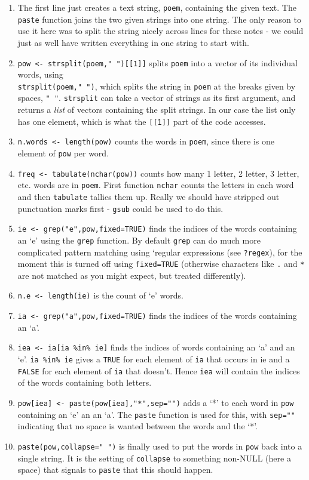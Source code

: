 \documentclass[10pt] {article}
\theoremstyle{definition}
\begin{document}
\begin{enumerate}
\item The first line just creates a text string, {\tt poem}, containing the given text. The {\tt paste} function joins the two given strings into one string. The only reason to use it here was to split the string nicely across lines for these notes - we could just as well have written everything in one string to start with.
\item \verb+pow <- strsplit(poem," ")[[1]]+ splits {\tt poem} into a vector of its individual words, using\\ \verb+strsplit(poem," ")+, which splits the string in {\tt poem} at the breaks given by spaces, \verb+" "+. {\tt strsplit} can take a vector of strings as its first argument, and returns a {\em list} of vectors containing the split strings. In our case the list only has one element, which is what the \verb+[[1]]+ part of the code accesses. 
\item \verb+n.words <- length(pow)+ counts the words in {\tt poem}, since there is one element of {\tt pow} per word.
\item \verb+freq <- tabulate(nchar(pow))+ counts how many 1 letter, 2 letter, 3 letter, etc. words are in {\tt poem}. First function {\tt nchar} counts the letters in each word and then {\tt tabulate} tallies them up. Really we should have stripped out punctuation marks first - {\tt gsub} could be used to do this.
\item \verb+ie <- grep("e",pow,fixed=TRUE)+ finds the indices of the words containing an `e' using the {\tt grep} function. By default {\tt grep} can do much more complicated pattern matching using `regular expressions (see {\tt ?regex}), for the moment this is turned off using \verb+fixed=TRUE+ (otherwise characters like \verb+.+ and \verb+*+ are not matched as you might expect, but treated differently).
\item \verb+n.e <- length(ie)+ is the count of `e' words.
\item \verb+ia <- grep("a",pow,fixed=TRUE)+ finds the indices of the words containing an `a'.
\item \verb+iea <- ia[ia %in% ie]+ finds the indices of words containing an `a' and an `e'. \verb+ia %in% ie+ gives a {\tt TRUE} for each element of {\tt ia} that occurs in {ie} and a {\tt FALSE} for each element of {\tt ia} that doesn't. Hence {\tt iea} will contain the indices of the words containing both letters.
\item \verb+pow[iea] <- paste(pow[iea],"*",sep="")+ adds a `*' to each word in {\tt pow} containing an `e' an an `a'. The {\tt paste} function is used for this, with \verb+sep=""+ indicating that no space is wanted between the words and the `*'.
\item \verb+paste(pow,collapse=" ")+ is finally used to put the words in {\tt pow} back into a single string. It is the setting of {\tt collapse} to something non-NULL (here a space) that signals to {\tt paste} that this should happen.
\end{enumerate}
\end{document}
